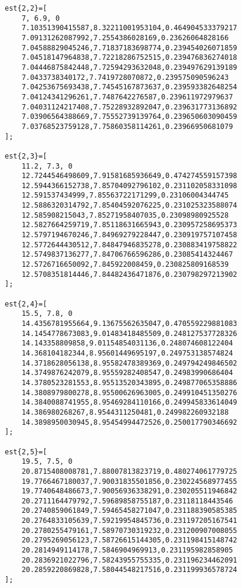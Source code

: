 \begin{verbatim}
est{2,2}=[
    7, 6.9, 0
    7.10351390415587,8.32211001953104,0.464904533379217
    7.09131262087992,7.2554386028169,0.23626064828166
    7.04588829045246,7.71837183698774,0.239454026071859
    7.04518147964838,7.72218286752515,0.239476836274018
    7.04446875842448,7.72594293632048,0.239497629139189
    7.0433738340172,7.7419728070872,0.239575090596243
    7.04253675693438,7.74545167873637,0.239593382648254
    7.04124341296261,7.7487642276587,0.239611972979637
    7.04031124217408,7.75228932892047,0.239631773136892
    7.03906564388669,7.75552739139764,0.239650603090459
    7.03768523759128,7.75860358114261,0.23966950681079
];

est{2,3}=[
    11.2, 7.3, 0
    12.7244546498609,7.91581685936649,0.474274559157398
    12.5944366152738,7.85704092796102,0.231102058331098
    12.591537434999,7.85563722171299,0.23106004344745
    12.5886320314792,7.85404592076225,0.231025323588074
    12.585908215043,7.85271958407035,0.23098980925528
    12.5827664259719,7.85118631665943,0.230957258695373
    12.5797194670246,7.84969279228447,0.230919757107458
    12.5772644430512,7.84847946835278,0.230883419758822
    12.5749837136277,7.84706766596286,0.23085414324467
    12.5726716650092,7.845922008459,0.230825809168539
    12.5708351814446,7.84482436471876,0.230798297213902
];

est{2,4}=[
    15.5, 7.8, 0
    14.4356781955664,9.13675562635047,0.470559229881083
    14.1454778673083,9.01483418485509,0.248127537728326
    14.143358809858,9.01154854031136,0.248074608122404
    14.368104182344,8.95601449695197,0.249753138574824
    14.3718628056138,8.95582478389369,0.249794249846502
    14.3749876242079,8.95559282408547,0.24983990686404
    14.3780523281553,8.95513520343895,0.249877065358886
    14.3808979800278,8.95500626963005,0.249910451350276
    14.3840088741955,8.95469284110166,0.249945833614049
    14.386980268267,8.9544311250481,0.249982260932188
    14.3898950030945,8.95454994472526,0.250017790346692
];

est{2,5}=[
    19.5, 7.5, 0
    20.8715408008781,7.88007813823719,0.480274061779725
    19.7766467180037,7.90031835501856,0.230224568977455
    19.7740648486673,7.90056936338291,0.230205511946842
    20.2711164479792,7.59689858755187,0.23118118443546
    20.2740859061849,7.59465458271047,0.231188390585385
    20.2764833105639,7.59219954845736,0.231197205167541
    20.2780255479161,7.58970730319232,0.231200907008055
    20.2795269056123,7.58726615144305,0.231198415148742
    20.2814949114178,7.5846904969913,0.231195982858905
    20.2836921022796,7.58243955755335,0.231196234462091
    20.2859220869828,7.58044548217516,0.231199936578724
];


\end{verbatim}

